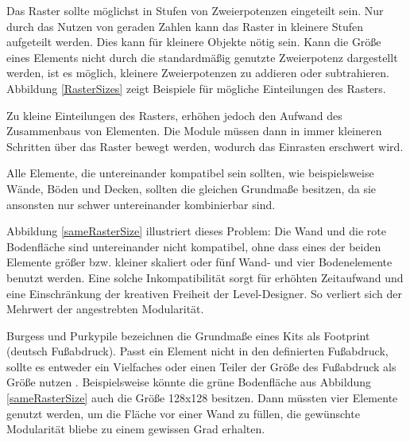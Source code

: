 \vspace{-10.5pt}
Das Raster sollte möglichst in Stufen von Zweierpotenzen eingeteilt sein. Nur durch das Nutzen von geraden Zahlen kann das Raster in kleinere Stufen aufgeteilt werden. Dies kann für kleinere Objekte nötig sein. Kann die Größe eines Elements nicht durch die standardmäßig genutzte Zweierpotenz dargestellt werden, ist es möglich, kleinere Zweierpotenzen zu addieren oder subtrahieren. Abbildung \ref{RasterSizes} zeigt Beispiele für mögliche Einteilungen des Rasters. \parencite{Mader}
\par
Zu kleine Einteilungen des Rasters, erhöhen jedoch den Aufwand des Zusammenbaus von Elementen. Die Module müssen dann in immer kleineren Schritten über das Raster bewegt werden, wodurch das Einrasten erschwert wird. \parencite{Mader} 
\par
Alle Elemente, die untereinander kompatibel sein sollten, wie beispielsweise Wände, Böden und Decken, sollten die gleichen Grundmaße besitzen, da sie ansonsten nur schwer untereinander kombinierbar sind. \parencite{Mader}
\par
Abbildung \ref{sameRasterSize} illustriert dieses Problem: Die Wand und die rote Bodenfläche sind untereinander nicht kompatibel, ohne dass eines der beiden Elemente größer bzw. kleiner skaliert oder fünf Wand- und vier Bodenelemente benutzt werden. Eine solche Inkompatibilität sorgt für erhöhten Zeitaufwand und eine Einschränkung der kreativen Freiheit der Level-Designer. So verliert sich der Mehrwert der angestrebten Modularität.
\par
Burgess und Purkypile bezeichnen die Grundmaße eines Kits als Footprint (deutsch Fußabdruck). Passt ein Element nicht in den definierten Fußabdruck, sollte es entweder ein Vielfaches oder einen Teiler der Größe des Fußabdruck als Größe nutzen \parencite{Burgess}.
\enlargethispage{10.5pt}
\newpage
Beispielsweise könnte die grüne Bodenfläche aus Abbildung \ref{sameRasterSize} auch die Größe 128x128 besitzen. Dann müssten vier Elemente genutzt werden, um die Fläche vor einer Wand zu füllen, die gewünschte Modularität bliebe zu einem gewissen Grad erhalten.
